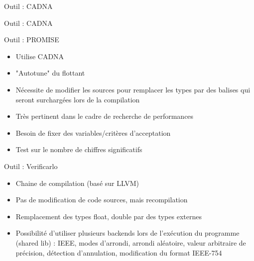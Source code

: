 \documentclass{beamer}
\begin{document}
  \begin{frame}{Outil : CADNA}
\cadnanosample
  \end{frame}
  

    \begin{frame}{Outil : CADNA}
\cadnasample
  \end{frame}
  
    \begin{frame}{Outil : PROMISE}
        \begin{itemize}
    \item Utilise CADNA
    \item "Autotune" du flottant
    \item Nécessite de modifier les sources pour remplacer les types par des balises qui seront surchargées lors de la compilation
    \item Très pertinent dans le cadre de recherche de performances
    \item Besoin de fixer des variables/critères d'acceptation
    \item Test sur le nombre de chiffres significatifs
    \end{itemize}
  \end{frame}

  
      \begin{frame}{Outil : Verificarlo}
\begin{itemize}
\item Chaine de compilation (basé sur LLVM)
\item Pas de modification de code sources, mais recompilation
\item Remplacement des types float, double par des types externes
\item Possibilité d'utiliser plusieurs backends lors de l'exécution du programme (shared lib) : IEEE, modes d'arrondi, arrondi aléatoire, valeur arbitraire de précision, détection d'annulation, modification du format IEEE-754
\end{itemize}
  \end{frame}
    
\end{document}
